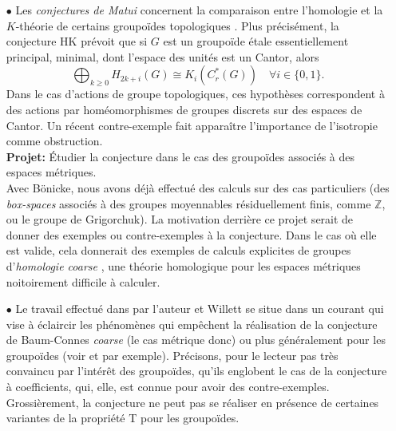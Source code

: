 \documentclass[a4paper,11pt]{article}
\begin{document}
\begin{itemize}
La strat\'egie est ici claire pour la preuve: la classe de complexit\'e nulle satisfaisant l'\'enonc\'e du th\'eor\`eme, il suffit de d\'emontrer que la conjecture est stable pour des d\'ecompositions de groupo\"ides. Essentiellement, cela a d\'ej\`a \'et\'e fait par l'auteur et B\"onicke pour la formule de K\"unneth dans \cite{BonickeDellAiera}. Appliquer la m\^eme id\'ee \`a Baum-Connes est naturel, m\^eme si des difficult\'es techniques devront \^etre surmont\'ees.\\

\item[$\bullet$] Les \textit{conjectures de Matui} concernent la comparaison entre l'homologie et la $K$-th\'eorie de certains groupo\"ides topologiques \cite{matui2016topological}. Plus pr\'ecis\'ement, la conjecture HK pr\'evoit que si $G$ est un groupo\"ide \'etale essentiellement principal, minimal, dont l'espace des unit\'es est un Cantor, alors
\[\bigoplus_{k\geq 0} H_{2k+i}(G) \cong K_i(C^*_r(G))\quad \forall i\in \{0,1\}.\]
Dans le cas d'actions de groupe topologiques, ces hypoth\`eses correspondent \`a des actions par hom\'eomorphismes de groupes discrets sur des espaces de Cantor. Un r\'ecent contre-exemple \cite{scarparo2018homology} fait appara\^itre l'importance de l'isotropie comme obstruction. \\

\textbf{Projet:} \'Etudier la conjecture dans le cas des groupo\"ides associ\'es \`a des espaces m\'etriques. \\

Avec B\"onicke, nous avons d\'ej\`a effectu\'e des calculs sur des cas particuliers (des \textit{box-spaces} associ\'es \`a des groupes moyennables r\'esiduellement finis, comme $\mathbb Z$, ou le groupe de Grigorchuk). La motivation derri\`ere ce projet serait de donner des exemples ou contre-exemples \`a la conjecture. Dans le cas o\`u elle est valide, cela donnerait des exemples de calculs explicites de groupes d'\textit{homologie coarse} \cite{NowakYu}, une th\'eorie homologique pour les espaces m\'etriques noitoirement difficile \`a calculer.\\


\item[$\bullet$] Le travail effectu\'e dans \cite{DellWillett} par l'auteur et Willett se situe dans un courant qui vise \`a \'eclaircir les ph\'enom\`enes qui emp\^echent la r\'ealisation de la conjecture de Baum-Connes \textit{coarse} (le cas m\'etrique donc) ou plus g\'en\'eralement pour les groupo\"ides (voir \cite{HigsonLaffSk} et \cite{WillettYu} par exemple). Pr\'ecisons, pour le lecteur pas tr\`es convaincu par l'int\'er\^et des groupo\"ides, qu'ils englobent le cas de la conjecture \`a coefficients, qui, elle, est connue pour avoir des contre-exemples. Grossi\`erement, la conjecture ne peut pas se r\'ealiser en pr\'esence de certaines variantes de la propri\'et\'e T pour les groupo\"ides. \\ 


\end{itemize}
\end{document}

